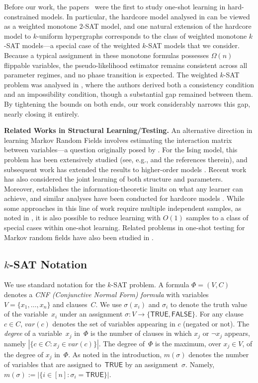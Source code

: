 \documentclass[11pt]{article}
\theoremstyle{definition}
\theoremstyle{remark}
\def\TRUE{\mathsf{TRUE}}
\def\FALSE{\mathsf{FALSE}}
\begin{document}
Before our work, the papers~\cite{BR21,GKK24} were the first to study one-shot learning in hard-constrained models. In particular, the hardcore model analysed in \cite{BR21} can be viewed as a weighted monotone $2$-SAT model, and one natural extension of the hardcore model to $k$-uniform hypergraphs corresponds to the class of weighted monotone $k$-SAT models—a special case of the weighted $k$-SAT models that we consider. Because a typical assignment in these monotone formulas possesses $\Omega(n)$ flippable variables, the pseudo-likelihood estimator remains consistent across all parameter regimes, and no phase transition is expected. 
The weighted $k$-SAT problem was analysed in \cite{GKK24}, where the authors derived both a consistency condition and an impossibility condition, though a substantial gap remained between them. By tightening the bounds on both ends, our work considerably narrows this gap, nearly closing it entirely.

\noindent\textbf{Related Works in Structural Learning/Testing.}
An alternative direction in learning Markov Random Fields involves estimating the interaction matrix between variables—a question originally posed by \cite{ChowLiu68}. For the Ising model, this problem has been extensively studied (see, e.g., \cite{Bresler15, VMLC16, BGS17} and the references therein), and subsequent work has extended the results to higher-order models \cite{KilvansMeka17, HKM17, GMM24}. Recent work \cite{ZhangKKW20, DDDVK21, GM24} has also considered the joint learning of both structure and parameters. Moreover, \cite{SanthanamWainwright12} establishes the information-theoretic limits on what any learner can achieve, and similar analyses have been conducted for hardcore models \cite{BGS14a, BGS14b}.
While some approaches in this line of work require multiple independent samples, as noted in \cite{DDDVK21}, it is also possible to reduce learning with $O(1)$ samples to a class of special cases within one-shot learning. 
Related problems in one-shot testing for Markov random fields have also been studied in \cite{BreslerNagaraj18,DDK18,MukherjeeMukherjeeYuan18,BBCSV20,BCSV21}.


 
 
\subsection{$k$-SAT Notation}
\label{sec:prelim}
We use standard notation for the $k$-SAT problem. A formula $\Phi=(V,C)$ denotes a  \emph{CNF (Conjunctive Normal Form) formula} with variables   $V=\{x_1,\dots, x_n\}$ and clauses~$C$. We use $\sigma(x_i)$ and $\sigma_i$ to denote the truth value of the variable~$x_i$ under an assignment $\sigma \colon V \to \{\TRUE,\FALSE\}$.
For any clause $c\in C$,   $var(c)$ denotes the set of variables appearing in $c$ (negated or not).  
The \emph{degree} of a variable~$x_j$ in~$\Phi$ is   the number of clauses in which $x_j$ or $\neg x_j$ appears,  namely $|\{c\in C: x_j\in var(c)\}|$. The degree of~$\Phi$ is the maximum, over $x_j \in V$, of the degree of $x_j$ in~$\Phi$.   
As noted in the introduction, $m(\sigma)$
denotes the number of variables that are assigned to~$\TRUE$ by an assignment~$\sigma$. Namely, 
$m(\sigma):=|\{i\in [n]:\sigma_i = \TRUE\}|$.
\end{document}
